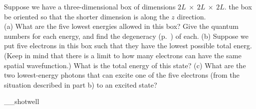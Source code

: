 Suppose we have a three-dimensional box of dimensions $2L\ \times\ 2L\ \times\ 2L$.
the box be oriented so that the shorter dimension is along the $z$ direction.\\
(a) What are the five lowest energies allowed in this box? Give the quantum numbers for each energy,
and find the degeneracy (p.~\pageref{subsubsec:degeneracy}) of each.\hwendpart
(b) Suppose we put five electrons in this box such that they have the lowest
possible total energ. (Keep in
mind that there is a limit to how many electrons can have the same spatial wavefunction.) What is the
total energy of this state?\answercheck\hwendpart
(c) What are the two lowest-energy photons that can excite one of the five electrons (from the situation
described in part b) to an excited state?\answercheck\hwendpart

__shotwell
